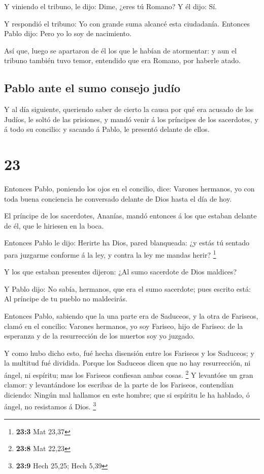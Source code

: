  Y viniendo el tribuno, le dijo: Dime, ¿eres tú Romano? Y
él dijo: Sí.

 Y respondió el tribuno: Yo con grande suma alcancé esta
ciudadanía. Entonces Pablo dijo: Pero yo lo soy de nacimiento.

 Así que, luego se apartaron de él los que le habían de
atormentar: y aun el tribuno también tuvo temor, entendido que era
Romano, por haberle atado.

\hypertarget{pablo-ante-el-sumo-consejo-juduxedo}{%
\subsection{Pablo ante el sumo consejo
judío}\label{pablo-ante-el-sumo-consejo-juduxedo}}

 Y al día siguiente, queriendo saber de cierto la causa por
qué era acusado de los Judíos, le soltó de las prisiones, y mandó venir
á los príncipes de los sacerdotes, y á todo su concilio: y sacando á
Pablo, le presentó delante de ellos.

\hypertarget{section-22}{%
\section{23}\label{section-22}}

 Entonces Pablo, poniendo los ojos en el concilio, dice:
Varones hermanos, yo con toda buena conciencia he conversado delante de
Dios hasta el día de hoy.

 El príncipe de los sacerdotes, Ananías, mandó entonces á
los que estaban delante de él, que le hiriesen en la boca.

 Entonces Pablo le dijo: Herirte ha Dios, pared blanqueada:
¿y estás tú sentado para juzgarme conforme á la ley, y contra la ley me
mandas herir? \footnote{\textbf{23:3} Mat 23,37}

 Y los que estaban presentes dijeron: ¿Al sumo sacerdote de
Dios maldices?

 Y Pablo dijo: No sabía, hermanos, que era el sumo
sacerdote; pues escrito está: Al príncipe de tu pueblo no maldecirás.

 Entonces Pablo, sabiendo que la una parte era de Saduceos,
y la otra de Fariseos, clamó en el concilio: Varones hermanos, yo soy
Fariseo, hijo de Fariseo: de la esperanza y de la resurrección de los
muertos soy yo juzgado.

 Y como hubo dicho esto, fué hecha disensión entre los
Fariseos y los Saduceos; y la multitud fué dividida.  Porque
los Saduceos dicen que no hay resurrección, ni ángel, ni espíritu; mas
los Fariseos confiesan ambas cosas. \footnote{\textbf{23:8} Mat 22,23}
 Y levantóse un gran clamor: y levantándose los escribas de
la parte de los Fariseos, contendían diciendo: Ningún mal hallamos en
este hombre; que si espíritu le ha hablado, ó ángel, no resistamos á
Dios. \footnote{\textbf{23:9} Hech 25,25; Hech 5,39}

